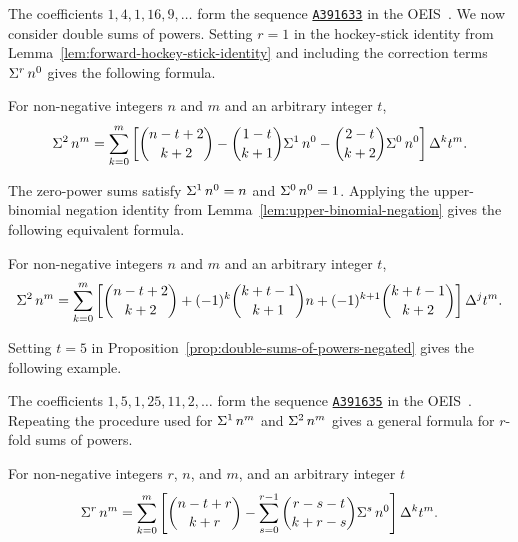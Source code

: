 
The coefficients $1,4,1,16,9,\dots$ form the sequence
\href{https://oeis.org/A391633}{\texttt{A391633}}
in the OEIS~\cite{sloane2003line}.
We now consider double sums of powers. Setting $r=1$ in the hockey-stick identity from Lemma~\eqref{lem:forward-hockey-stick-identity} and including the correction terms $\Sigma^{r}\,{n}^{0}$ gives the following formula.
\begin{proposition}
  \label{prop:double-sums-of-powers}
  For non-negative integers $n$ and $m$ and an arbitrary integer $t$,
  \begin{align*}
    \Sigma^{2}\,{n}^{m}
    = \sum_{k=0}^{m}
    \left[
      \binom{n-t+2}{k+2}
      - \binom{1-t}{k+1} \Sigma^{1}\,{n}^{0}
      - \binom{2-t}{k+2} \Sigma^{0}\,{n}^{0}
    \right] \Delta^{k} t^m.
  \end{align*}
\end{proposition}
The zero-power sums satisfy $\Sigma^{1}\,{n}^{0}=n$ and $\Sigma^{0}\,{n}^{0}=1$.
Applying the upper-binomial negation identity from Lemma~\eqref{lem:upper-binomial-negation} gives the following equivalent formula.
\begin{proposition}
  \label{prop:double-sums-of-powers-negated}
  For non-negative integers $n$ and $m$ and an arbitrary integer $t$,
  \begin{align*}
    \Sigma^{2}\,{n}^{m}
    = \sum_{k=0}^{m}
    \left[
      \binom{n-t+2}{k+2} + (-1)^k \binom{k+t-1}{k+1} n
      + (-1)^{k+1} \binom{k+t-1}{k+2}
    \right] \Delta^{j} t^m.
  \end{align*}
\end{proposition}
Setting $t=5$ in Proposition~\eqref{prop:double-sums-of-powers-negated} gives the following example.

The coefficients $1,5,1,25,11,2,\dots$ form the sequence
\href{https://oeis.org/A391635}{\texttt{A391635}}
in the OEIS~\cite{sloane2003line}.
Repeating the procedure used for $\Sigma^{1}\,{n}^{m}$ and $\Sigma^{2}\,{n}^{m}$ gives a general formula for $r$-fold sums of powers.
\begin{theorem}
  \label{thm:multifold-sums-of-powers}
  For non-negative integers $r$, $n$, and $m$, and an arbitrary integer $t$
  \begin{align*}
    \Sigma^{r}\,{n}^{m}
    = \sum_{k=0}^{m}
    \left[
      \binom{n-t+r}{k+r}
      -
      \sum_{s=0}^{r-1}
      \binom{r-s-t}{k+r-s}
      \Sigma^{s}\,{n}^{0}
    \right] \Delta^{k} t^{m}.
  \end{align*}
\end{theorem}
